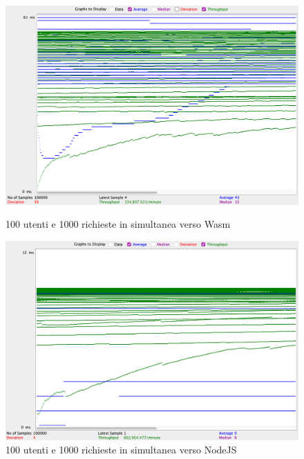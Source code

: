 \begin{figure}[H]
        \includegraphics[width=\linewidth]{chapters/3.poc/benchmarks_images/wasi_100_thread_1000_req.png}
        \caption{100 utenti e 1000 richieste in simultanea verso Wasm}\label{fig:100_thread_1000_req_wasi}
    \endminipage\hfill
        \includegraphics[width=\linewidth]{chapters/3.poc/benchmarks_images/node_100_thread_1000_req.png}
        \caption{100 utenti e 1000 richieste in simultanea verso NodeJS}\label{fig:100_thread_1000_req_node}
    \endminipage\hfill
\end{figure}

